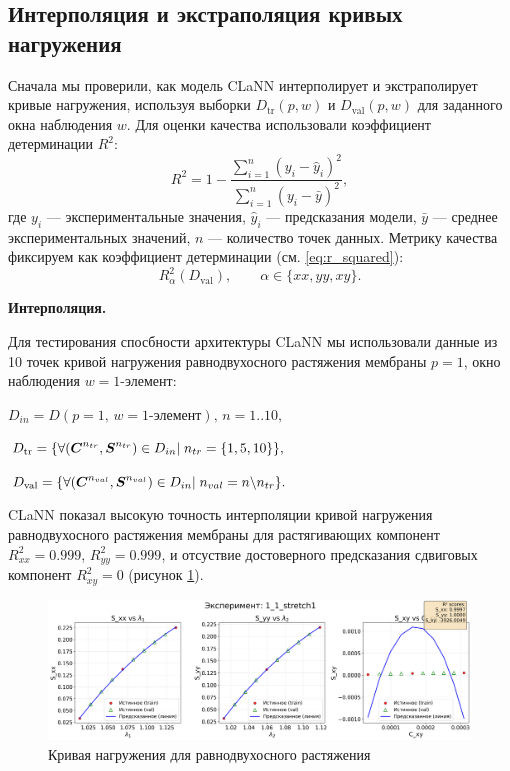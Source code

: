 \subsection{Интерполяция и экстраполяция кривых нагружения}
  Сначала мы проверили, как модель CLaNN интерполирует и экстраполирует кривые нагружения, используя выборки
  $D_{\mathrm{tr}}(p,w)$ и $D_{\mathrm{val}}(p,w)$ для заданного окна наблюдения $w$.
  Для оценки качества использовали коэффициент детерминации $R^2$:
  \begin{equation}
  R^2 = 1 - \frac{\sum_{i=1}^n (y_i - \hat{y}_i)^2}{\sum_{i=1}^n (y_i - \bar{y})^2},
  \label{eq:r_squared}
  \end{equation}
  где $y_i$ — экспериментальные значения, $\hat{y}_i$ — предсказания модели, $\bar{y}$ — среднее экспериментальных значений, $n$ — количество точек данных.
  Метрику качества фиксируем как коэффициент детерминации (см. \eqref{eq:r_squared}):
\[
  R^2_{\alpha}(D_{\mathrm{val}}),\qquad \alpha\in\{xx,yy,xy\}.
\]

  \textbf{Интерполяция.}  

  Для тестирования спосбности архитектуры CLaNN мы использовали данные из 
  10 точек кривой нагружения равнодвухосного растяжения мембраны $p=1$, 
  окно наблюдения $w=\text{1-элемент}$:
  
  $D_{in} = D(p{=}1,\,w{=}\text{1-элемент}),\, n = 1..10,$
  
  $D_{\mathrm{tr}}=\{\forall (\boldsymbol{C}^{n_{tr}}, \boldsymbol{S}^{n_{tr}}) \in D_{in}|\; n_{tr}=\{1,5,10\}\},$
  
  $D_{\mathrm{val}}=\{\forall (\boldsymbol{C}^{n_{val}}, \boldsymbol{S}^{n_{val}}) \in D_{in}|\; n_{val}=n \backslash  n_{tr}\}.$

  CLaNN показал высокую точность интерполяции кривой нагружения равнодвухосного растяжения мембраны 
  для растягивающих компонент $R^2_{xx}=0.999$, $R^2_{yy}=0.999$, и отсуствие достоверного предсказания сдвиговых 
  компонент $R^2_{xy}=0$ (рисунок \ref{fig:interpolation}).
  
  \begin{figure}[H]
    \centering
    \includegraphics[width=1.0\textwidth]{img/interpolation.png}
    \caption{Кривая нагружения для равнодвухосного растяжения}
    \label{fig:interpolation}
  \end{figure}
  
